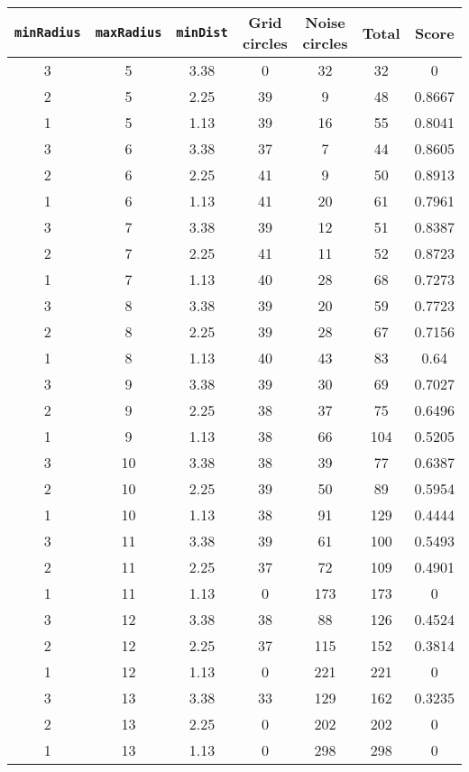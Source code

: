 \documentclass[letterpaper, 12pt]{article}
\begin{document}
\begin{longtable}{|c|c|c|c|c|c|c|}
\hline
\textbf{\texttt{minRadius}} & \textbf{\texttt{maxRadius}} & \textbf{\texttt{minDist}} & \textbf{Grid circles} & \textbf{Noise circles} & \textbf{Total} & \textbf{Score} \\
\hline
3 & 5 & 3.38 & 0 & 32 & 32 & 0 \\
\hline
2 & 5 & 2.25 & 39 & 9 & 48 & 0.8667 \\
\hline
1 & 5 & 1.13 & 39 & 16 & 55 & 0.8041 \\
\hline
3 & 6 & 3.38 & 37 & 7 & 44 & 0.8605 \\
\hline
2 & 6 & 2.25 & 41 & 9 & 50 & 0.8913 \\
\hline
1 & 6 & 1.13 & 41 & 20 & 61 & 0.7961 \\
\hline
3 & 7 & 3.38 & 39 & 12 & 51 & 0.8387 \\
\hline
2 & 7 & 2.25 & 41 & 11 & 52 & 0.8723 \\
\hline
1 & 7 & 1.13 & 40 & 28 & 68 & 0.7273 \\
\hline
3 & 8 & 3.38 & 39 & 20 & 59 & 0.7723 \\
\hline
2 & 8 & 2.25 & 39 & 28 & 67 & 0.7156 \\
\hline
1 & 8 & 1.13 & 40 & 43 & 83 & 0.64 \\
\hline
3 & 9 & 3.38 & 39 & 30 & 69 & 0.7027 \\
\hline
2 & 9 & 2.25 & 38 & 37 & 75 & 0.6496 \\
\hline
1 & 9 & 1.13 & 38 & 66 & 104 & 0.5205 \\
\hline
3 & 10 & 3.38 & 38 & 39 & 77 & 0.6387 \\
\hline
2 & 10 & 2.25 & 39 & 50 & 89 & 0.5954 \\
\hline
1 & 10 & 1.13 & 38 & 91 & 129 & 0.4444 \\
\hline
3 & 11 & 3.38 & 39 & 61 & 100 & 0.5493 \\
\hline
2 & 11 & 2.25 & 37 & 72 & 109 & 0.4901 \\
\hline
1 & 11 & 1.13 & 0 & 173 & 173 & 0 \\
\hline
3 & 12 & 3.38 & 38 & 88 & 126 & 0.4524 \\
\hline
2 & 12 & 2.25 & 37 & 115 & 152 & 0.3814 \\
\hline
1 & 12 & 1.13 & 0 & 221 & 221 & 0 \\
\hline
3 & 13 & 3.38 & 33 & 129 & 162 & 0.3235 \\
\hline
2 & 13 & 2.25 & 0 & 202 & 202 & 0 \\
\hline
1 & 13 & 1.13 & 0 & 298 & 298 & 0 \\

\end{longtable}
\end{document}
